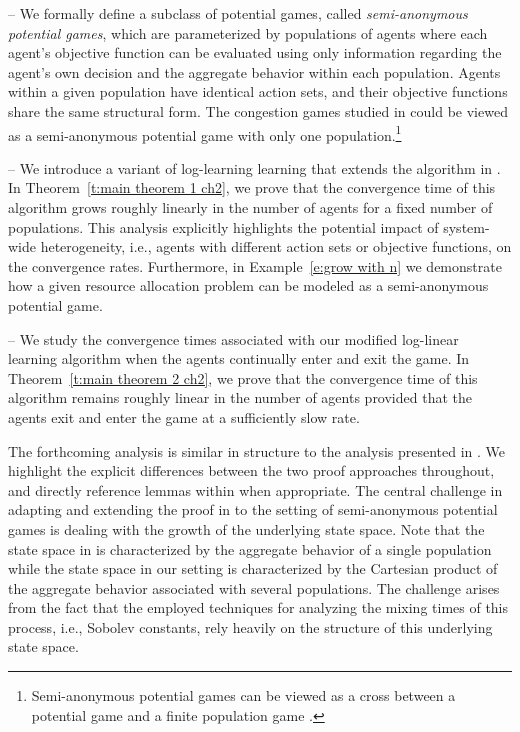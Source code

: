 \vspace{.1cm}
%
\noindent -- We formally define a subclass of potential games, called {\it semi-anonymous potential games}, which are parameterized by populations of agents where each agent's objective function can be evaluated using only information regarding the agent's own decision and the aggregate behavior within each population.  Agents within a given population have identical action sets, and their objective functions share the same structural form.  The congestion games studied in \cite{Shah2010} could be viewed as a semi-anonymous potential game with only one population.\footnote{Semi-anonymous potential games can be viewed as a cross between a potential game and a finite population game \cite{Blume1996}.}

\vspace{.1cm}
%
\noindent -- We introduce a variant of log-learning learning that extends the algorithm in \cite{Shah2010}.  In Theorem~\ref{t:main theorem 1 ch2}, we prove that the convergence time of this algorithm grows roughly linearly in the number of agents for a fixed number of populations.  This analysis explicitly highlights the potential impact of system-wide heterogeneity, i.e., agents with different action sets or objective functions, on the convergence rates.  Furthermore, in Example~\ref{e:grow with n} we demonstrate how a given resource allocation problem can be modeled as a semi-anonymous potential game.  

\vspace{.1cm}
%
\noindent -- We study the convergence times associated with our modified log-linear learning algorithm when the agents continually enter and exit the game.  In Theorem~\ref{t:main theorem 2 ch2}, we prove that the convergence time of this algorithm remains roughly linear in the number of agents provided that the agents exit and enter the game at a sufficiently slow rate. 

The forthcoming analysis is similar in structure to the analysis presented in \cite{Shah2010}.  We highlight the explicit differences between the two proof approaches throughout, and directly reference lemmas within \cite{Shah2010} when appropriate.  The central challenge in adapting and extending the proof in \cite{Shah2010} to the setting of semi-anonymous potential games is dealing with the growth of the underlying state space.  Note that the state space in \cite{Shah2010} is characterized by the aggregate behavior of a single population while the state space in our setting is characterized by the Cartesian product of the aggregate behavior associated with several populations.  The challenge arises from the fact that the employed techniques for analyzing the mixing times of this process, i.e., Sobolev constants, rely heavily on the structure of this underlying state space.  



